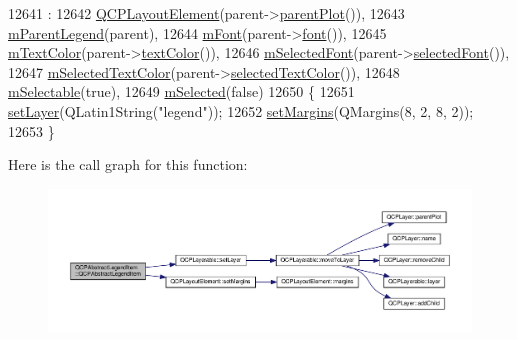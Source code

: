 \begin{DoxyCode}
12641                                                               :
12642   \hyperlink{class_q_c_p_layout_element_a8947f0ada17e672aaba3d424cbbb67e3}{QCPLayoutElement}(parent->\hyperlink{class_q_c_p_layerable_ab7e0e94461566093d36ffc0f5312b109}{parentPlot}()),
12643   \hyperlink{class_q_c_p_abstract_legend_item_aafcd9fc6fcb10f4a8d46037011afafe8}{mParentLegend}(parent),
12644   \hyperlink{class_q_c_p_abstract_legend_item_ae916a78ac0d2a60e20a17ca2f24f9754}{mFont}(parent->\hyperlink{class_q_c_p_legend_a5cf8b840bc02f7bf4edb8dde400d0f41}{font}()),
12645   \hyperlink{class_q_c_p_abstract_legend_item_a974b21e9930227d281344bd2242d289d}{mTextColor}(parent->\hyperlink{class_q_c_p_legend_ad60a058af7491f6b140c104c6a0f9458}{textColor}()),
12646   \hyperlink{class_q_c_p_abstract_legend_item_ab971df604306b192875a7d097feb1e21}{mSelectedFont}(parent->\hyperlink{class_q_c_p_legend_a4c1b08fc0afacb4ffd54f6a49737fa77}{selectedFont}()),
12647   \hyperlink{class_q_c_p_abstract_legend_item_a4965c13854d970b24c284f0a4f005fbd}{mSelectedTextColor}(parent->\hyperlink{class_q_c_p_legend_a08005f3c17728c2c4e23b8ffc0842ffb}{selectedTextColor}()),
12648   \hyperlink{class_q_c_p_abstract_legend_item_aa84029f57b1b32f642fb7db63c3fc2c2}{mSelectable}(\textcolor{keyword}{true}),
12649   \hyperlink{class_q_c_p_abstract_legend_item_ae58ebebbd0c36cc6fe897483369984d2}{mSelected}(\textcolor{keyword}{false})
12650 \{
12651   \hyperlink{class_q_c_p_layerable_ab0d0da6d2de45a118886d2c8e16d5a54}{setLayer}(QLatin1String(\textcolor{stringliteral}{"legend"}));
12652   \hyperlink{class_q_c_p_layout_element_a8f450b1f3f992ad576fce2c63d8b79cf}{setMargins}(QMargins(8, 2, 8, 2));
12653 \}
\end{DoxyCode}


Here is the call graph for this function\+:\nopagebreak
\begin{figure}[H]
\begin{center}
\leavevmode
\includegraphics[width=350pt]{class_q_c_p_abstract_legend_item_afaff87610e8da0fa238ecf552872d774_cgraph}
\end{center}
\end{figure}




